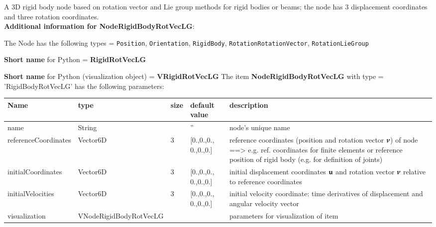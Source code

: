 %
\newpage

\label{sec:item:NodeRigidBodyRotVecLG}
A 3D rigid body node based on rotation vector and Lie group methods for rigid bodies or beams; the node has 3 displacement coordinates and three rotation coordinates.\vspace{12pt}
 \\{\bf Additional information for NodeRigidBodyRotVecLG}:
\bi
  \item The Node has the following types = \texttt{Position}, \texttt{Orientation}, \texttt{RigidBody}, \texttt{RotationRotationVector}, \texttt{RotationLieGroup}
  \item {\bf Short name} for Python = {\bf RigidRotVecLG}  \item {\bf Short name} for Python (visualization object) = {\bf VRigidRotVecLG}\ei
\vspace{12pt} \noindent The item {\bf NodeRigidBodyRotVecLG} with type = 'RigidBodyRotVecLG' has the following parameters:\vspace{-1cm}\\ 
\begin{center}
  \footnotesize
  \begin{longtable}{| p{4.5cm} | p{2.5cm} | p{0.5cm} | p{2.5cm} | p{6cm} |}
    \hline
    \bf Name & \bf type & \bf size & \bf default value & \bf description \\ \hline
    name &     String &      &     '' &     node's unique name\\ \hline
    referenceCoordinates &     Vector6D &     3 &     [0.,0.,0., 0.,0.,0.] &     reference coordinates (position and rotation vector $\mbox{\boldmath $\nu$ \unboldmath}\!\!$) of node ==> e.g. ref. coordinates for finite elements or reference position of rigid body (e.g. for definition of joints)\\ \hline
    initialCoordinates &     Vector6D &     3 &     [0.,0.,0., 0.,0.,0.] &     initial displacement coordinates $\mathbf{u}$ and rotation vector $\mbox{\boldmath $\nu$ \unboldmath}\!\!$ relative to reference coordinates\\ \hline
    initialVelocities &     Vector6D &     3 &     [0.,0.,0., 0.,0.,0.] &     initial velocity coordinate: time derivatives of displacement and angular velocity vector\\ \hline
    visualization & VNodeRigidBodyRotVecLG & & & parameters for visualization of item \\ \hline
	  \end{longtable}
	\end{center}
